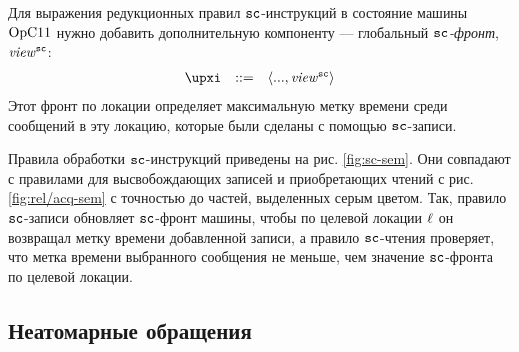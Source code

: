 Для выражения редукционных правил ${\mathtt{sc}}$-инструкций в состояние машины $\mathrm{OpC11}$
нужно добавить дополнительную компоненту --- глобальный \emph{${\mathtt{sc}}$-фронт}, $\mathit{view}^{\text{\scriptsize{\texttt{sc}}}}$:
\[\begin{array}{rcl}
\auxX & ::= & \angled{..., \stSC}
\end{array}\]
Этот фронт по локации определяет максимальную метку времени среди сообщений в эту локацию,
которые были сделаны с помощью ${\mathtt{sc}}$-записи.

Правила обработки ${\mathtt{sc}}$-инструкций приведены на рис. \ref{fig:sc-sem}.
Они совпадают с правилами для высвобождающих записей и приобретающих чтений с рис. \ref{fig:rel/acq-sem}
с точностью до частей, выделенных серым цветом.
Так, правило ${\mathtt{sc}}$-записи обновляет ${\mathtt{sc}}$-фронт машины, чтобы по целевой локации $\ell$ он
возвращал метку времени добавленной записи, а правило ${\mathtt{sc}}$-чтения проверяет, что метка времени
выбранного сообщения не меньше, чем значение ${\mathtt{sc}}$-фронта по целевой локации.

\subsection{Неатомарные обращения}
\label{sec:opc11:formal:na}

